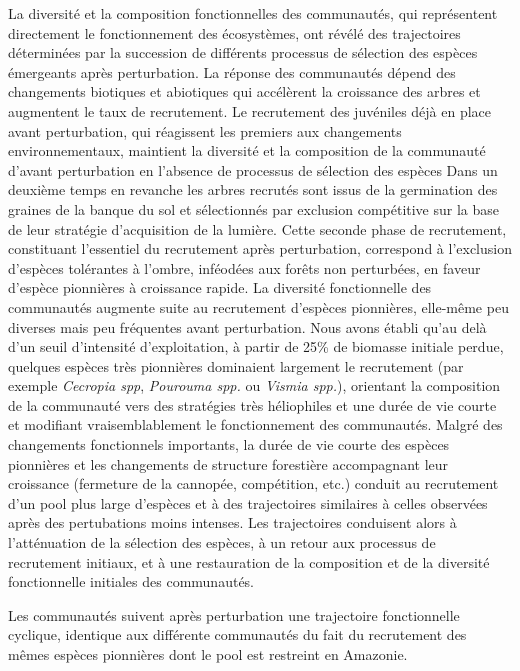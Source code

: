 \documentclass[
  11pt,
  french,
  A4paper,
  extrafontsizes,onecolumn,openright
  ]{memoir}
\begin{document}
La diversité et la composition fonctionnelles des communautés, qui
représentent directement le fonctionnement des écosystèmes, ont révélé
des trajectoires déterminées par la succession de différents processus
de sélection des espèces émergeants après perturbation. La réponse des
communautés dépend des changements biotiques et abiotiques qui
accélèrent la croissance des arbres et augmentent le taux de
recrutement. Le recrutement des juvéniles déjà en place avant
perturbation, qui réagissent les premiers aux changements
environnementaux, maintient la diversité et la composition de la
communauté d'avant perturbation en l'absence de processus de sélection
des espèces Dans un deuxième temps en revanche les arbres recrutés sont
issus de la germination des graines de la banque du sol et sélectionnés
par exclusion compétitive sur la base de leur stratégie d'acquisition de
la lumière. Cette seconde phase de recrutement, constituant l'essentiel
du recrutement après perturbation, correspond à l'exclusion d'espèces
tolérantes à l'ombre, inféodées aux forêts non perturbées, en faveur
d'espèce pionnières à croissance rapide. La diversité fonctionnelle des
communautés augmente suite au recrutement d'espèces pionnières,
elle-même peu diverses mais peu fréquentes avant perturbation. Nous
avons établi qu'au delà d'un seuil d'intensité d'exploitation, à partir
de 25\% de biomasse initiale perdue, quelques espèces très pionnières
dominaient largement le recrutement (par exemple \emph{Cecropia spp},
\emph{Pourouma spp.} ou \emph{Vismia spp.}), orientant la composition de
la communauté vers des stratégies très héliophiles et une durée de vie
courte et modifiant vraisemblablement le fonctionnement des communautés.
Malgré des changements fonctionnels importants, la durée de vie courte
des espèces pionnières et les changements de structure forestière
accompagnant leur croissance (fermeture de la cannopée, compétition,
etc.) conduit au recrutement d'un pool plus large d'espèces et à des
trajectoires similaires à celles observées après des pertubations moins
intenses. Les trajectoires conduisent alors à l'atténuation de la
sélection des espèces, à un retour aux processus de recrutement
initiaux, et à une restauration de la composition et de la diversité
fonctionnelle initiales des communautés.

Les communautés suivent après perturbation une trajectoire fonctionnelle
cyclique, identique aux différente communautés du fait du recrutement
des mêmes espèces pionnières dont le pool est restreint en Amazonie.
\end{document}
